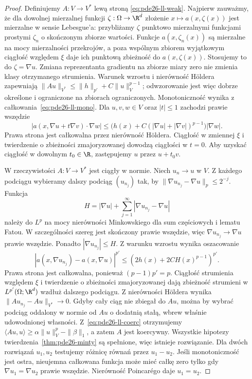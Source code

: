 \begin{proof}
Definiujemy $A:V\to V^*$ lewą stroną
\eqref{eq:pde26-ll-weak}. Najpierw zauważmy, że dla
dowolnej mierzalnej funkcji $\zeta:\Omega\to\R^d$
złożenie $x\mapsto a(x,\zeta(x))$ jest mierzalne
w sensie Lebesgue'a: przybliżamy $\zeta$ punktowo
mierzalnymi funkcjami prostymi $\zeta_n$ o skończonym
zbiorze wartości. Funkcje $a(x,\zeta_n(x))$ są mierzalne
na mocy mierzalności przekrojów, a poza wspólnym
zbiorem wyjątkowym ciągłość względem $\xi$ daje
ich punktową zbieżność do $a(x,\zeta(x))$.
Stosujemy to do $\zeta=\nabla u$.
Zmiana reprezentanta gradientu na zbiorze miary zero
nie zmienia klasy otrzymanego strumienia.
Warunek wzrostu i nierówność Höldera zapewniają
$\|Au\|_{V^*}\le\|h\|_{p'}+C\|u\|_V^{p-1}$;
odwzorowanie jest więc dobrze określone i ograniczone
na zbiorach ograniczonych. Monotoniczność wynika
z całkowania~\eqref{eq:pde26-ll-mono}.
Dla $u,v,w\in V$ oraz $|t|\le1$ zachodzi prawie wszędzie
\[
 |a(x,\nabla u+t\nabla v)\cdot\nabla w|
 \le\bigl(h(x)+C(|\nabla u|+|\nabla v|)^{p-1}\bigr)
 |\nabla w|.
\]
Prawa strona jest całkowalna przez nierówność Höldera.
Ciągłość w zmiennej $\xi$ i twierdzenie o zbieżności
zmajoryzowanej dowodzą ciągłości w $t=0$.
Aby uzyskać ciągłość w dowolnym $t_0\in\R$,
zastępujemy $u$ przez $u+t_0v$.

W rzeczywistości $A:V\to V^*$ jest ciągły w normie.
Niech $u_n\to u$ w $V$. Z każdego podciągu wybieramy
dalszy podciąg $(u_{n_j})$ tak, by
$\|\nabla u_{n_j}-\nabla u\|_p\le 2^{-j}$.
Funkcja
\[
 H=|\nabla u|+\sum_{j=1}^\infty
                         |\nabla u_{n_j}-\nabla u|
\]
należy do $L^p$ na mocy nierówności Minkowskiego
dla sum częściowych i lematu Fatou.
W szczególności szereg jest skończony prawie wszędzie,
więc $\nabla u_{n_j}\to\nabla u$ prawie wszędzie.
Ponadto $|\nabla u_{n_j}|\le H$. Z warunku wzrostu
wynika oszacowanie
\[
 |a(x,\nabla u_{n_j})-a(x,\nabla u)|^{p'}
 \le (2h(x)+2CH(x)^{p-1})^{p'}.
\]
Prawa strona jest całkowalna, ponieważ $(p-1)p'=p$.
Ciągłość strumienia względem $\xi$ i twierdzenie
o zbieżności zmajoryzowanej dają zbieżność strumieni
w $L^{p'}(\Omega;\R^d)$ wzdłuż dalszego podciągu.
Z nierówności Höldera wynika
$\|Au_{n_j}-Au\|_{V^*}\to0$.
Gdyby cały ciąg nie zbiegał do $Au$, można by
wybrać podciąg oddalony w normie od $Au$ o dodatnią
stałą, wbrew właśnie udowodnionej własności.
Z~\eqref{eq:pde26-ll-coerc} otrzymujemy
$\langle Au,u\rangle\ge\alpha\|u\|_V^p-\|\beta\|_1$,
a zatem $A$ jest koercywny.
Wszystkie hipotezy twierdzenia~\ref{thm:pde26-minty}
są spełnione, więc istnieje rozwiązanie.
Dla dwóch rozwiązań $u_1,u_2$ testujemy różnicę
równań przez $u_1-u_2$. Jeśli monotoniczność jest
ostra, nieujemna całkowana funkcja może mieć całkę
zero tylko gdy $\nabla u_1=\nabla u_2$ prawie wszędzie.
Nierówność Poincarégo daje $u_1=u_2$.
\end{proof}

